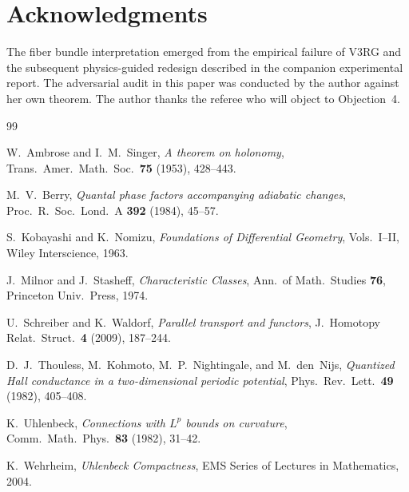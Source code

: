\documentclass[12pt]{amsart}
\theoremstyle{plain}
\theoremstyle{definition}
\begin{document}
\section*{Acknowledgments}

The fiber bundle interpretation emerged from the empirical failure of V3RG
and the subsequent physics-guided redesign described in the companion
experimental report. The adversarial audit in this paper was conducted by
the author against her own theorem. The author thanks the referee who
will object to Objection~4.


\begin{thebibliography}{99}

W.~Ambrose and I.~M.~Singer,
\textit{A theorem on holonomy},
Trans.\ Amer.\ Math.\ Soc.\ \textbf{75} (1953), 428--443.

M.~V.~Berry,
\textit{Quantal phase factors accompanying adiabatic changes},
Proc.\ R.\ Soc.\ Lond.\ A \textbf{392} (1984), 45--57.

S.~Kobayashi and K.~Nomizu,
\textit{Foundations of Differential Geometry}, Vols.~I--II,
Wiley Interscience, 1963.

J.~Milnor and J.~Stasheff,
\textit{Characteristic Classes},
Ann.\ of Math.\ Studies \textbf{76}, Princeton Univ.\ Press, 1974.

U.~Schreiber and K.~Waldorf,
\textit{Parallel transport and functors},
J.\ Homotopy Relat.\ Struct.\ \textbf{4} (2009), 187--244.

D.~J.~Thouless, M.~Kohmoto, M.~P.~Nightingale, and M.~den~Nijs,
\textit{Quantized Hall conductance in a two-dimensional periodic potential},
Phys.\ Rev.\ Lett.\ \textbf{49} (1982), 405--408.

K.~Uhlenbeck,
\textit{Connections with $L^p$ bounds on curvature},
Comm.\ Math.\ Phys.\ \textbf{83} (1982), 31--42.

K.~Wehrheim,
\textit{Uhlenbeck Compactness},
EMS Series of Lectures in Mathematics, 2004.

\end{thebibliography}
\end{document}
